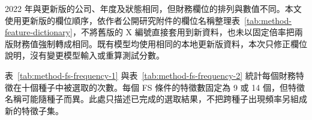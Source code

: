 2022 年與更新版的公司、年度及狀態相同，但財務欄位的排列與數值不同。本文使用更新版的欄位順序，依作者公開研究附件的欄位名稱整理表~\ref{tab:method-feature-dictionary}，不將舊版的 X 編號直接套用到新資料，也未以固定倍率把兩版財務值強制轉成相同。既有模型均使用相同的本地更新版資料，本次只修正欄位說明，沒有變更模型輸入或重算測試分數。



表~\ref{tab:method-fs-frequency-1} 與表~\ref{tab:method-fs-frequency-2} 統計每個財務特徵在十個種子中被選取的次數。每個 FS 條件的特徵數固定為 9 或 14 個，但特徵名稱可能隨種子而異。此處只描述已完成的選取結果，不把跨種子出現頻率另組成新的特徵子集。



\endgroup
